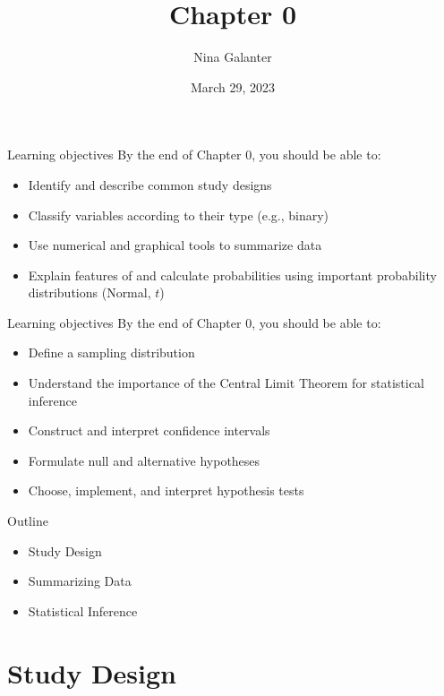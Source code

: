 \documentclass[
  ignorenonframetext,
]{beamer}
\title{Chapter 0}
\author{Nina Galanter}
\date{March 29, 2023}
\providecommand{\tightlist}{%
  \setlength{\itemsep}{0pt}\setlength{\parskip}{0pt}}
\begin{document}
\frame{\titlepage}

\begin{frame}{Learning objectives}
\protect\hypertarget{learning-objectives}{}
By the end of Chapter 0, you should be able to:

\begin{itemize}
\tightlist
\item
  Identify and describe common study designs
\item
  Classify variables according to their type (e.g., binary)
\item
  Use numerical and graphical tools to summarize data
\item
  Explain features of and calculate probabilities using important
  probability distributions (Normal, \(t\))
\end{itemize}
\end{frame}

\begin{frame}{Learning objectives}
\protect\hypertarget{learning-objectives-1}{}
By the end of Chapter 0, you should be able to:

\begin{itemize}
\tightlist
\item
  Define a sampling distribution
\item
  Understand the importance of the Central Limit Theorem for statistical
  inference
\item
  Construct and interpret confidence intervals
\item
  Formulate null and alternative hypotheses
\item
  Choose, implement, and interpret hypothesis tests
\end{itemize}
\end{frame}

\begin{frame}{Outline}
\protect\hypertarget{outline}{}
\begin{itemize}
\item
  Study Design
\item
  Summarizing Data
\item
  Statistical Inference
\end{itemize}
\end{frame}

\hypertarget{study-design}{%
\section{Study Design}\label{study-design}}
\end{document}
